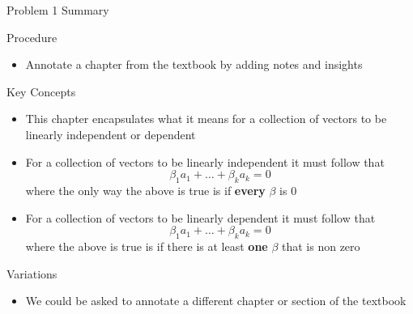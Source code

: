 \begin{summary}{Problem 1 Summary}
    \begin{statement}{Procedure}
        \begin{itemize}
            \item Annotate a chapter from the textbook by adding notes and insights
        \end{itemize}
    \end{statement}
    \begin{statement}{Key Concepts}
        \begin{itemize}
            \item This chapter encapsulates what it means for a collection of vectors to be linearly independent or dependent
            \item For a collection of vectors to be linearly independent it must follow that
            \begin{equation*}
                \beta_{1}a_{1} + \dots + \beta_{k}a_{k} = 0
            \end{equation*}
            where the only way the above is true is if \textbf{every} $\beta$ is 0
            \item For a collection of vectors to be linearly dependent it must follow that 
            \begin{equation*}
                \beta_{1}a_{1} + \dots + \beta_{k}a_{k} = 0
            \end{equation*}
            where the above is true is if there is at least \textbf{one} $\beta$ that is non zero
        \end{itemize}
    \end{statement}
    \begin{statement}{Variations}
        \begin{itemize}
            \item We could be asked to annotate a different chapter or section of the textbook
        \end{itemize}
    \end{statement}
\end{summary}

